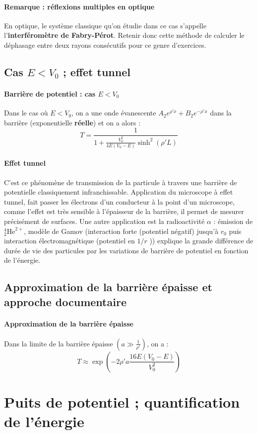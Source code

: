\documentclass[french]{book}
\theoremstyle{plain}
\theoremstyle{definition}
\theoremstyle{remark}
\begin{document}
\paragraph{Remarque : réflexions multiples en optique} En optique, le système classique qu'on étudie dans ce cas s'appelle l'\textbf{interféromètre de Fabry-Pérot}. Retenir donc cette méthode de calculer le déphasage entre deux rayons consécutifs pour ce genre d'exercices.
\subsection{Cas $E<V_0$ ; effet tunnel}
\paragraph{Barrière de potentiel : cas $E<V_0$}Dans le cas où $E<V_0$, on a une onde évanescente $A_2e^{\rho'x}+B_2e^{-\rho'x}$ dans la barrière (exponentielle \textbf{réelle}) et on a alors : $$T=\frac{1}{1+\displaystyle\frac{V_0^2}{4E(V_0-E)}\sinh^2(\rho'L)}$$
\paragraph{Effet tunnel} C’est ce phénomène de transmission de la particule à travers une barrière de potentielle classiquement infranchissable. Application du microscope à effet tunnel, fait passer les électrons d’un conducteur à la point d’un microscope, comme l’effet est très sensible à l’épaisseur de la barrière, il permet de mesurer précisément de surfaces. Une autre application est la radioactivité $\alpha$ : émission de $_2^4\text{He}^{2+}$, modèle de Gamov (interaction forte (potentiel négatif) jusqu’à $r_0$ puis interaction électromagnétique (potentiel en $1/r$ )) explique la grande différence de durée de vie des particules par les variations de barrière de potentiel en fonction de l’énergie.
\subsection{Approximation de la barrière épaisse et approche documentaire}
\paragraph{Approximation de la barrière épaisse}
Dans la limite de la barrière épaisse $\displaystyle\left(a\gg \frac{1}{\rho'}\right)$, on a : $$T\approx \exp\left(-2\rho'a\frac{16E(V_0-E)}{V_0^2}\right)$$
\section{Puits de potentiel ; quantification de l'énergie}
\end{document}
